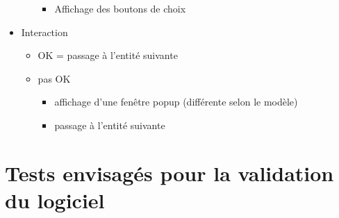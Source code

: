 \begin{itemize}
\begin{itemize}
\begin{itemize}
			\item Affichage des boutons de choix
		\end{itemize}
	\end{itemize}
	\item Interaction
	\begin{itemize}
		\item OK = passage à l'entité suivante
		\item pas OK
		\begin{itemize}
			\item affichage d'une fenêtre popup (différente selon le modèle)
			\item passage à l'entité suivante
		\end{itemize}
	\end{itemize}
\end{itemize}

\section{Tests envisagés pour la validation du logiciel}

